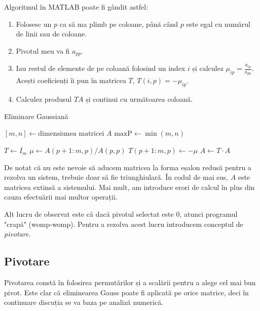 \documentclass{exam}
\newcommand{\octavescript}[2]{
	
}
\begin{document}
Algoritmul în MATLAB poate fi gândit astfel:
\begin{enumerate}
	\item Folosesc un $p$ ca să ma plimb pe coloane, până când $p$ este egal
	      cu numărul de linii sau de coloane.
	\item Pivotul meu va fi $a_{pp}$.
	\item Iau restul de elemente de pe coloană folosind un index $i$ și calculez
	      $\mu_{ip} = \frac{a_{ip}}{a_{pp}}$. Acești coeficienți îi pun în
	      matricea $T$, $T(i, p) = -\mu_{ip}$.
	\item Calculez produsul $TA$ și continui cu următoarea coloană.
\end{enumerate}

\begin{algorithm}
	\caption{Eliminare Gaussiană}
	\begin{algorithmic}[1]
		\State \( [m, n] \gets \text{dimensiunea matricei } A \)
		\State \( \text{maxP} \gets \min(m, n) \) 

		\State \( T \gets I_m \) 
		\State \( \mu \gets A(p+1:m, p) / A(p, p) \) 
		\State \( T(p+1:m, p) \gets -\mu \) 
		\State \( A \gets T \cdot A \) 
		\EndFor
	\end{algorithmic}
\end{algorithm}

De notat că nu este nevoie să aducem matricea la forma eșalon redusă pentru
a rezolva un sistem, trebuie doar să fie triunghiulară. În codul de mai sus, $A$
este matricea extinsă a sistemului. Mai mult, am introduce erori de calcul în
plus din cauza efectuării mai multor operații.

Alt lucru de observat este că dacă pivotul selectat este 0, atunci
programul "crapă" (womp-womp). Pentru a rezolva acest lucru introducem
conceptul de \textit{pivotare}.

\subsection{Pivotare}

Pivotarea constă în folosirea permutărilor și a scalării pentru a alege
cel mai bun pivot. Este clar că eliminearea Gauss poate fi aplicată pe orice
matrice, deci în continuare discuția se va baza pe analiză numerică.
\end{document}
